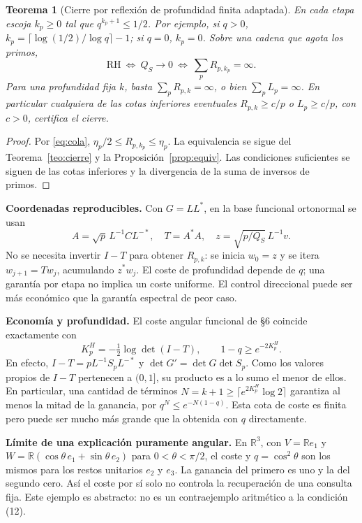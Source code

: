 \documentclass[11pt,a4paper]{article}
\theoremstyle{plain}
\newtheorem{teorema}{Teorema}
\newcommand{\R}{\mathbb{R}}
\begin{document}
\begin{teorema}[Cierre por reflexión de profundidad finita adaptada]\label{teo:profundidad}
En cada etapa escoja $k_p\ge0$ tal que $q^{k_p+1}\le1/2$. Por ejemplo, si $q>0$, $k_p=\lceil\log(1/2)/\log q\rceil-1$; si $q=0$, $k_p=0$. Sobre una cadena que agota los primos,
\begin{equation}\label{eq:cierreiter}
 \mathrm{RH}\ \Longleftrightarrow\ Q_S\to0\ \Longleftrightarrow\
 \sum_p R_{p,k_p}=\infty.
\end{equation}
Para una profundidad fija $k$, basta $\sum_p R_{p,k}=\infty$, o bien $\sum_p L_p=\infty$. En particular cualquiera de las cotas inferiores eventuales $R_{p,k}\ge c/p$ o $L_p\ge c/p$, con $c>0$, certifica el cierre.
\end{teorema}
\begin{proof}
Por \eqref{eq:cola}, $\eta_p/2\le R_{p,k_p}\le\eta_p$. La equivalencia se sigue del Teorema~\ref{teo:cierre} y la Proposición~\ref{prop:equiv}. Las condiciones suficientes se siguen de las cotas inferiores y la divergencia de la suma de inversos de primos.
\end{proof}

\textbf{Coordenadas reproducibles.} Con $G=LL^*$, en la base funcional ortonormal se usan
\[
 A=\sqrt p\,L^{-1}CL^{-*},\quad T=A^*A,\quad
 z=\sqrt{p/Q_S}\,L^{-1}v.
\]
No se necesita invertir $I-T$ para obtener $R_{p,k}$: se inicia $w_0=z$ y se itera $w_{j+1}=Tw_j$, acumulando $z^*w_j$. El coste de profundidad depende de $q$; una garantía por etapa no implica un coste uniforme. El control direccional puede ser más económico que la garantía espectral de peor caso.


\textbf{Economía y profundidad.} El coste angular funcional de §6 coincide exactamente con
\[
 K_p^H=-\tfrac12\log\det(I-T),\qquad
 1-q\ge e^{-2K_p^H}.
\]
En efecto, $I-T=pL^{-1}S_pL^{-*}$ y $\det G'=\det G\det S_p$. Como los valores propios de $I-T$ pertenecen a $(0,1]$, su producto es a lo sumo el menor de ellos. En particular, una cantidad de términos $N=k+1\ge\lceil e^{2K_p^H}\log 2\rceil$ garantiza al menos la mitad de la ganancia, por $q^N\le e^{-N(1-q)}$. Esta cota de coste es finita pero puede ser mucho más grande que la obtenida con $q$ directamente.

\textbf{Límite de una explicación puramente angular.} En $\R^3$, con $V=\R e_1$ y $W=\R(\cos\theta\,e_1+\sin\theta\,e_2)$ para $0<\theta<\pi/2$, el coste y $q=\cos^2\theta$ son los mismos para los restos unitarios $e_2$ y $e_3$. La ganancia del primero es uno y la del segundo cero. Así el coste por sí solo no controla la recuperación de una consulta fija. Este ejemplo es abstracto: no es un contraejemplo aritmético a la condición (12).
\end{document}
